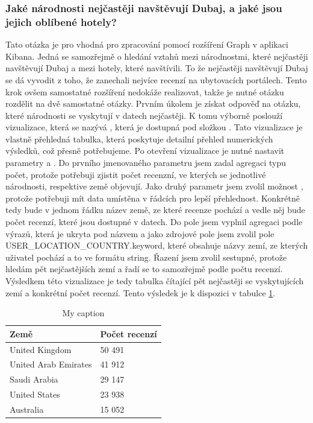 \documentclass[czech,BP]{thesiskiv}
\begin{document}
\subsubsection{Jaké národnosti nejčastěji navštěvují Dubaj, a jaké jsou jejich oblíbené hotely?}
\label{subsub:Národnosti}
Tato otázka je pro vhodná pro zpracování pomocí rozšíření Graph v aplikaci Kibana. Jedná se samozřejmě o hledání vztahů mezi národnostmi, které nejčastěji navštěvují Dubaj a mezi hotely, které navštívili. To že nejčastěji navštěvují Dubaj se dá vyvodit z toho, že zanechali nejvíce recenzí na ubytovacích portálech. Tento krok ovšem samostatné rozšíření nedokáže realizovat, takže je nutné otázku rozdělit na dvě samostatné otázky.
Prvním úkolem je získat odpověď na otázku, které národnosti se vyskytují v datech nejčastěji. K tomu výborně poslouží vizualizace, která se nazývá , která je dostupná pod složkou . Tato vizualizace je vlastně přehledná tabulka, která poskytuje detailní přehled numerických výsledků, což přesně potřebujeme. Po otevření vizualizace je nutné nastavit parametry  a . Do prvního jmenovaného parametru jsem zadal agregaci typu počet, protože potřebuji zjistit počet recenzní, ve kterých se jednotlivé národnosti, respektive země objevují. Jako druhý parametr jsem zvolil možnost , protože potřebuji mít data umístěna v řádcích pro lepší přehlednost. Konkrétně tedy bude v jednom řádku název země, ze které recenze pochází a vedle něj bude počet recenzí, které jsou dostupné v datech. Do pole  jsem vyplnil agregaci podle výrazů, která je ukryta pod názvem  a jako zdrojové pole jsem zvolil pole USER\_LOCATION\_COUNTRY.keyword, které obsahuje názvy zemí, ze kterých uživatel pochází a to ve formátu string. Řazení jsem zvolil sestupné, protože hledám pět nejčastějších zemí a řadí se to samozřejmě podle počtu recenzí. Výsledkem této vizualizace je tedy tabulka čítající pět nejčastěji se vyskytujících zemí a konkrétní počet recenzí. Tento výsledek je k dispozici v tabulce \ref{Pocet_zeme}.
\begin{table}[]
	\centering
	\begin{tabular}{|l|l|}
		\hline
		\textbf{Země}        & \textbf{Počet recenzí} \\ \hline
		United Kingdom       & 50 491                 \\ \hline
		United Arab Emirates & 41 912                 \\ \hline
		Saudi Arabia         & 29 147                 \\ \hline
		United States        & 23 938                 \\ \hline
		Australia            & 15 052                 \\ \hline
	\end{tabular}
	\caption{My caption}
	\label{Pocet_zeme}
\end{table}
\end{document}
